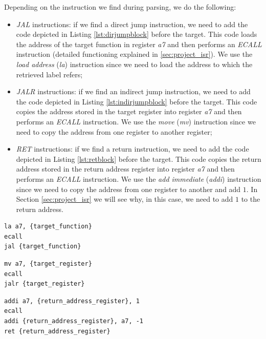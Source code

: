 Depending on the instruction we find during parsing, we do the following:
\begin{itemize}
  \item \textit{JAL} instructions: if we find a direct jump instruction, we need
    to add the code depicted in Listing \ref{lst:dirjumpblock} before the target.
    This code loads the address of the target function in register \textit{a7}
    and then performs an \textit{ECALL} instruction (detailed functioning
    explained in \ref{sec:project_isr}). We use the \textit{load address} (\textit{la})
    instruction since we need to load the address to which the retrieved label
    refers;

  \item \textit{JALR} instructions: if we find an indirect jump instruction, we
    need to add the code depicted in Listing \ref{lst:indirjumpblock} before the
    target. This code copies the address stored in the target register into register
    \textit{a7} and then performs an \textit{ECALL} instruction. We use the
    \textit{move} (\textit{mv}) instruction since we need to copy the address
    from one register to another register;

  \item \textit{RET} instructions: if we find a return instruction, we need to
    add the code depicted in Listing \ref{lst:retblock} before the target. This code
    copies the return address stored in the return address register into register
    \textit{a7} and then performs an \textit{ECALL} instruction. We use the
    \textit{add immediate} (\textit{addi}) instruction since we need to copy the
    address from one register to another and add $1$. In Section \ref{sec:project_isr}
    we will see why, in this case, we need to add $1$ to the return address.
\end{itemize}

\begin{lstlisting}[style=Assembly, caption = Direct jump code block, label={lst:dirjumpblock}]
la a7, {target_function}
ecall
jal {target_function}
\end{lstlisting}

\begin{lstlisting}[style=Assembly, caption = Indirect jump code block, label={lst:indirjumpblock}]
mv a7, {target_register}
ecall
jalr {target_register}
\end{lstlisting}

\begin{lstlisting}[style=Assembly, caption = Return code block, label={lst:retblock}]
addi a7, {return_address_register}, 1
ecall
addi {return_address_register}, a7, -1
ret {return_address_register}
\end{lstlisting}

